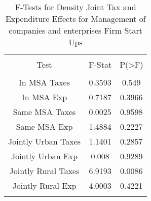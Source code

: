 
\begin{table}[!htbp] \centering 
  \caption{F-Tests for Density Joint Tax and Expenditure Effects for Management of companies and enterprises Firm Start Ups} 
  \label{55Ftests} 
\begin{tabular}{@{\extracolsep{5pt}} ccc} 
\\[-1.8ex]\hline 
\hline \\[-1.8ex] 
Test & F-Stat & P(\textgreater F) \\ 
\hline \\[-1.8ex] 
In MSA Taxes & 0.3593 & 0.549 \\ 
In MSA Exp & 0.7187 & 0.3966 \\ 
Same MSA Taxes & 0.0025 & 0.9598 \\ 
Same MSA Exp & 1.4884 & 0.2227 \\ 
Jointly Urban Taxes & 1.1401 & 0.2857 \\ 
Jointly Urban Exp & 0.008 & 0.9289 \\ 
Jointly Rural Taxes & 6.9193 & 0.0086 \\ 
Jointly Rural Exp & 4.0003 & 0.4221 \\ 
\hline \\[-1.8ex] 
\end{tabular} 
\end{table} 
